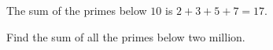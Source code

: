 
\begin{ProjectEuler}{10}
The sum of the primes below $10$ is $2 + 3 + 5 + 7 = 17$. \medskip

\noindent Find the sum of all the primes below two million.
\end{ProjectEuler}
